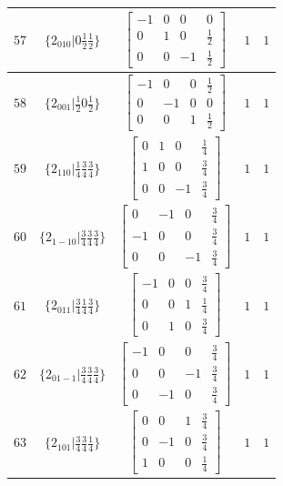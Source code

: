 \documentclass[fleqn,8pt]{jsarticle}
\begin{document}
\begin{longtable}{ccccc}
$ 57 $ & $ \{2{}_{010}|0 \frac{1}{2} \frac{1}{2}\} $ & $ \begin{bmatrix} -1 & 0 & 0 & 0 \\ 0 & 1 & 0 & \frac{1}{2} \\ 0 & 0 & -1 & \frac{1}{2} \end{bmatrix} $ & $ 1 $ & $ 1 $ \\ \hline
$ 58 $ & $ \{2{}_{001}|\frac{1}{2} 0 \frac{1}{2}\} $ & $ \begin{bmatrix} -1 & 0 & 0 & \frac{1}{2} \\ 0 & -1 & 0 & 0 \\ 0 & 0 & 1 & \frac{1}{2} \end{bmatrix} $ & $ 1 $ & $ 1 $ \\ \hline
$ 59 $ & $ \{2{}_{110}|\frac{1}{4} \frac{3}{4} \frac{3}{4}\} $ & $ \begin{bmatrix} 0 & 1 & 0 & \frac{1}{4} \\ 1 & 0 & 0 & \frac{3}{4} \\ 0 & 0 & -1 & \frac{3}{4} \end{bmatrix} $ & $ 1 $ & $ 1 $ \\ \hline
$ 60 $ & $ \{2{}_{1-10}|\frac{3}{4} \frac{3}{4} \frac{3}{4}\} $ & $ \begin{bmatrix} 0 & -1 & 0 & \frac{3}{4} \\ -1 & 0 & 0 & \frac{3}{4} \\ 0 & 0 & -1 & \frac{3}{4} \end{bmatrix} $ & $ 1 $ & $ 1 $ \\ \hline
$ 61 $ & $ \{2{}_{011}|\frac{3}{4} \frac{1}{4} \frac{3}{4}\} $ & $ \begin{bmatrix} -1 & 0 & 0 & \frac{3}{4} \\ 0 & 0 & 1 & \frac{1}{4} \\ 0 & 1 & 0 & \frac{3}{4} \end{bmatrix} $ & $ 1 $ & $ 1 $ \\ \hline
$ 62 $ & $ \{2{}_{01-1}|\frac{3}{4} \frac{3}{4} \frac{3}{4}\} $ & $ \begin{bmatrix} -1 & 0 & 0 & \frac{3}{4} \\ 0 & 0 & -1 & \frac{3}{4} \\ 0 & -1 & 0 & \frac{3}{4} \end{bmatrix} $ & $ 1 $ & $ 1 $ \\ \hline
$ 63 $ & $ \{2{}_{101}|\frac{3}{4} \frac{3}{4} \frac{1}{4}\} $ & $ \begin{bmatrix} 0 & 0 & 1 & \frac{3}{4} \\ 0 & -1 & 0 & \frac{3}{4} \\ 1 & 0 & 0 & \frac{1}{4} \end{bmatrix} $ & $ 1 $ & $ 1 $ \\ \hline

\end{longtable}
\end{document}
